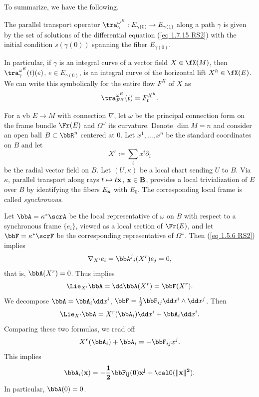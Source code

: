To summarize, we have the following.
\begin{prop}
    The parallel transport operator $\tra_\gamma^{\omega^E}:E_{\gamma(0)}\to E_{\gamma(1)}$ along a path $\gamma$ is given by the set of solutions of the differential equation (\ref{eq 1.7.15 RS2}) with the initial condition $s(\gamma(0))$ spanning the fiber $E_{\gamma(0)}$.
\end{prop}

\begin{rem}
    In particular, if $\gamma$ is an integral curve of a vector field $X\in\fX(M)$, then $\tra_\gamma^{\omega^E}(t)(e)$, $e\in E_{\gamma(0)}$, is an integral curve of the horizontal lift $X^h\in\fX(E)$. We can write this symbolically for the entire flow $F^X$ of $X$ as 
    \[\tra^{\omega^E}_{F^X}(t)=F_t^{X^h}.\]
\end{rem}

\begin{rem}\label{rem 1.7.19 RS2}
    For a \gls{vb} $E\to M$ with connection $\nabla$, let $\omega$  be the principal connection form on the frame bundle $\Fr(E)$ and $\Omega^\omega$ its curvature. Denote $\dim M=n$ and consider an open ball $B\subset \bbR^n$ centered at $0$. Let $x^1,\ldots,x^n$ be the standard coordinates on $B$ and let
    \[X^r\coloneqq \sum_i x^i\partial_i\]
    be the radial vector field on $B$. Let $(U,\kappa)$ be a local chart sending $U$ to $B$. Via $\kappa$, parallel transport along rays $t\mapsto t\bf{x}$, $\bf{x}\in B$, provides a local trivialization of $E$ over $B$ by identifying the fibers $E_{\bf{x}}$ with $E_0$. The corresponding local frame is called \emph{synchronous}.

    Let $\bbA=\kappa^\ast\scrA$ be the local representative of $\omega$ on $B$ with respect to a synchronous frame $\{e_i\}$, viewed as a local section of $\Fr(E)$, and let $\bbF=\kappa^\ast \scrF$ be the corresponding representative of  $\Omega^\omega$. Then (\ref{eq 1.5.6 RS2}) implies 
    \[\nabla_{X'}e_i=\bbA^j{}_i(X^r)e_j=0,\]
    that is, $\bbA(X^r)=0$. Thus implies
    \[\Lie_{X'}\bbA=\dd\bbA(X^r)=\bbF(X^r).\]
    We decompose $\bbA=\bbA_i\dd x^i$, $\bbF=\frac12 \bbF_{ij}\dd x^i\wedge \dd x^j$. Then
    \[\Lie_{X'}\bbA=X^r(\bbA_i)\dd x^i+\bbA_i\dd x^i.\]
    Comparing these two formulas, we read off
    \[X^r(\bbA_i)+\bbA_i=-\bbF_{ij}x^j.\]
    This implies
    \[\bbA_i(\bf{x})=-\frac12\bbF_{ij}(0)x^j+\calO(\lVert\bf{x}\rVert^2).\]
    In particular, $\bbA(0)=0$. 
\end{rem}







